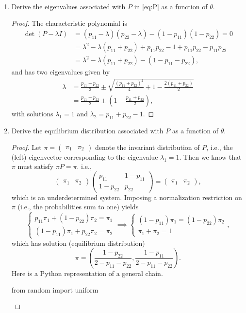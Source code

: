 \documentclass[oneside,reqno]{amsart}
\theoremstyle{definition}
\begin{document}
\begin{enumerate}[label=(\roman*)]
\item
Derive the eigenvalues associated with $P$ in \eqref{eq:P} as a function of $\theta$. 
\begin{proof}
The characteristic polynomial is
\begin{align*}
	\det(P - \lambda I) &= (p_{11} - \lambda )(p_{22} - \lambda) - (1-p_{11})(1-p_{22}) = 0 \\
	& = \lambda^2 - \lambda (p_{11} + p_{22}) + p_{11}p_{22} - 1 + p_{11} p_{22} - p_{11}p_{22} \\
	& = \lambda^2 - \lambda (p_{11} + p_{22}) - (1 - p_{11} - p_{22}),
\end{align*}
and has two eigenvalues given by
\begin{align*}
	\lambda &= \frac{p_{11} + p _{22}}{2} \pm \sqrt{\frac{(p_{11} + p _{22})^2}{4} +1 - \frac{2(p_{11} + p _{22})}{2}} \\
	&= \frac{p_{11} + p _{22}}{2} \pm \left(1 - \frac{p_{11} + p _{22}}{2} \right),
\end{align*}
with solutions $\lambda_1 = 1$ and $\lambda_2=  p_{11}+p_{22}-1$.
\end{proof}
\item
Derive the equilibrium distribution associated with $P$ as a function of $\theta$.
\begin{proof}
Let $\pi = \begin{pmatrix} \pi_1 & \pi_2\end{pmatrix}$ denote the invariant distribution of $P$, i.e., the (left) eigenvector corresponding to the eigenvalue $\lambda_1 = 1$. Then we know that $\pi$ must satisfy $\pi P = \pi$. i.e.,
\[
	\begin{pmatrix}
		\pi_1 & \pi_2
	\end{pmatrix}
	 \begin{pmatrix}
		p_{11} & 1-p_{11} \\
		1- p_{22} & p_{22}
	\end{pmatrix}
	=\begin{pmatrix}
		\pi_1 & \pi_2
	\end{pmatrix},
\]
which is an underdetermined system. Imposing a normalization restriction on $\pi$ (i.e., the probabilities sum to one) yields
\[
	\begin{cases}
		p_{11} \pi_1 + (1- p_{22}) \pi_2 = \pi_1 \\
		(1-p_{11}) \pi_1 + p_{22} \pi_2 = \pi_2
	\end{cases}
	\implies  
	\begin{cases}
		(1-p_{11}) \pi_1 =  (1- p_{22}) \pi_2 \\
		\pi_1 + \pi_2 = 1
	\end{cases},
\]
which has solution (equilibrium distribution)
\[
	\pi = \left(\frac{1-p_{22}}{2-p_{11}  - p_{22}}, \frac{1-p_{11}}{2-p_{11} - p_{22}} \right).
\]
Here is a Python representation of a general chain.
\begin{python3code}
from random import uniform


\end{python3code}
\end{proof}
\end{enumerate}
\end{document}
